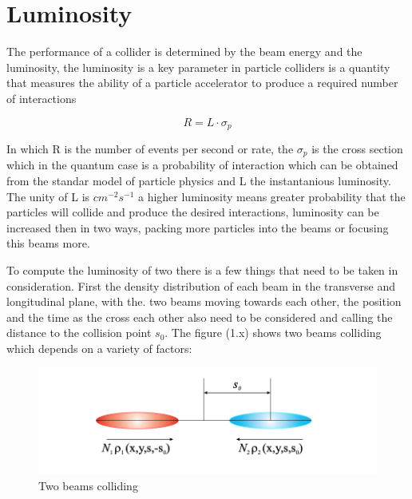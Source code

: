 


\section{Luminosity}

The performance of a collider is determined by the beam energy and the luminosity, the luminosity is a key parameter in particle colliders is a quantity that measures the ability of a particle accelerator to produce a required number of interactions\cite{Lum} 

\begin{equation}
R = L \cdot \sigma_{p} 
\end{equation}

In which R is the number of events per second or rate, the $\sigma_{p}$ is the cross section which in the quantum case is a probability of interaction which can be obtained from the standar model of particle physics and L the instantanious luminosity. The unity of L is  $cm^{-2} s^{-1}$ a higher luminosity means greater probability that the particles will collide and produce the desired interactions, luminosity can be increased then in two ways, packing more particles into the beams or focusing this beams more.  

To compute the luminosity of two there is a few things that need to be taken in consideration. First the density distribution of each beam in the transverse and longitudinal plane, with the. two beams moving towards each other, the position and the time as the cross each other also need to be considered and calling the distance to the collision point $s_{0}$. The figure (1.x) shows two beams colliding which depends on a variety of factors:


\begin{figure}[h]
    \centering
    \includegraphics[width=1\textwidth]{lumi.png}
    \caption{Two beams colliding}
    \label{fig:beamslumi}
\end{figure}


